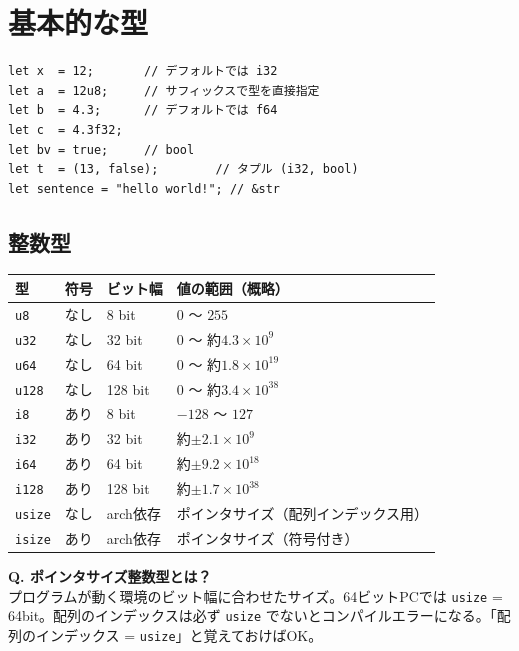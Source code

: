 \documentclass[12pt,a4paper]{article}
\begin{document}
\section{基本的な型}

\begin{lstlisting}
let x  = 12;       // デフォルトでは i32
let a  = 12u8;     // サフィックスで型を直接指定
let b  = 4.3;      // デフォルトでは f64
let c  = 4.3f32;
let bv = true;     // bool
let t  = (13, false);        // タプル (i32, bool)
let sentence = "hello world!"; // &str
\end{lstlisting}

\subsection*{整数型}

\begin{center}
\begin{tabular}{llll}
\toprule
\textbf{型} & \textbf{符号} & \textbf{ビット幅} & \textbf{値の範囲（概略）} \\
\midrule
\texttt{u8}    & なし & 8 bit   & $0$ 〜 $255$ \\
\texttt{u32}   & なし & 32 bit  & $0$ 〜 約$4.3\times10^{9}$ \\
\texttt{u64}   & なし & 64 bit  & $0$ 〜 約$1.8\times10^{19}$ \\
\texttt{u128}  & なし & 128 bit & $0$ 〜 約$3.4\times10^{38}$ \\
\texttt{i8}    & あり & 8 bit   & $-128$ 〜 $127$ \\
\texttt{i32}   & あり & 32 bit  & 約$\pm 2.1\times10^{9}$ \\
\texttt{i64}   & あり & 64 bit  & 約$\pm 9.2\times10^{18}$ \\
\texttt{i128}  & あり & 128 bit & 約$\pm 1.7\times10^{38}$ \\
\texttt{usize} & なし & arch依存 & ポインタサイズ（配列インデックス用） \\
\texttt{isize} & あり & arch依存 & ポインタサイズ（符号付き） \\
\bottomrule
\end{tabular}
\end{center}

\begin{qabox}
\textbf{Q. ポインタサイズ整数型とは？}\\
プログラムが動く環境のビット幅に合わせたサイズ。64ビットPCでは \texttt{usize} = 64bit。配列のインデックスは必ず \texttt{usize} でないとコンパイルエラーになる。「配列のインデックス = \texttt{usize}」と覚えておけばOK。
\end{qabox}
\end{document}
